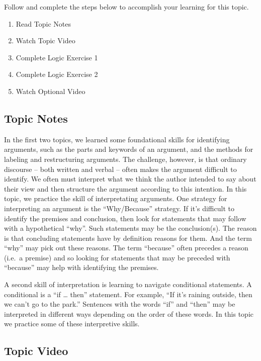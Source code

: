 \documentclass[
]{book}
\providecommand{\tightlist}{%
  \setlength{\itemsep}{0pt}\setlength{\parskip}{0pt}}
\begin{document}
Follow and complete the steps below to accomplish your learning for this topic.

\begin{enumerate}
\def\labelenumi{\arabic{enumi}.}
\tightlist
\item
  Read Topic Notes
\item
  Watch Topic Video
\item
  Complete Logic Exercise 1
\item
  Complete Logic Exercise 2
\item
  Watch Optional Video
\end{enumerate}

\hypertarget{topic-notes-10}{%
\subsection*{Topic Notes}\label{topic-notes-10}}

In the first two topics, we learned some foundational skills for identifying arguments, such as the parts and keywords of an argument, and the methods for labeling and restructuring arguments. The challenge, however, is that ordinary discourse -- both written and verbal -- often makes the argument difficult to identify. We often must interpret what we think the author intended to say about their view and then structure the argument according to this intention. In this topic, we practice the skill of interpretating arguments. One strategy for interpreting an argument is the ``Why/Because'' strategy. If it's difficult to identify the premises and conclusion, then look for statements that may follow with a hypothetical ``why''. Such statements may be the conclusion(s). The reason is that concluding statements have by definition reasons for them. And the term ``why'' may pick out these reasons. The term ``because'' often precedes a reason (i.e.~a premise) and so looking for statements that may be preceded with ``because'' may help with identifying the premises.

A second skill of interpretation is learning to navigate conditional statements. A conditional is a ``if \ldots{} then'' statement. For example, ``If it's raining outside, then we can't go to the park.'' Sentences with the words ``if'' and ``then'' may be interpreted in different ways depending on the order of these words. In this topic we practice some of these interpretive skills.

\hypertarget{topic-video-10}{%
\subsection*{Topic Video}\label{topic-video-10}}
\end{document}

